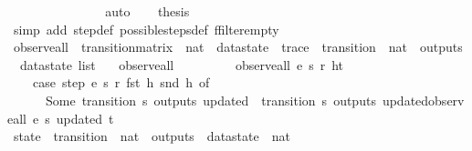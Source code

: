 \begin{isabellebody}
\ \ \ \ \ \ \ {\isacharbraceleft}{\isacharbar}{\isacharbar}{\isacharbraceright}\ {\isacharequal}\ {\isacharbraceleft}{\isacharbar}{\isacharbar}{\isacharbraceright}{\isachardoublequoteclose}\isanewline
\ \ \ \ \isamarkupfalse%
\ auto\isanewline
\ \ \isamarkupfalse%
\ {\isacharquery}thesis\isanewline
\ \ \ \ \isamarkupfalse%
\ {\isacharparenleft}simp\ add{\isacharcolon}\ step{\isacharunderscore}def\ possible{\isacharunderscore}steps{\isacharunderscore}def\ ffilter{\isacharunderscore}empty{\isacharparenright}\isanewline
{}\isamarkupfalse%
%
\endisatagproof
{\isafoldproof}%
%
\isadelimproof
\isanewline
%
\endisadelimproof
\isanewline
{}\isamarkupfalse%
\ observe{\isacharunderscore}all\ {\isacharcolon}{\isacharcolon}\ {\isachardoublequoteopen}transition{\isacharunderscore}matrix\ {\isasymRightarrow}\ nat\ {\isasymRightarrow}\ datastate\ {\isasymRightarrow}\ trace\ {\isasymRightarrow}\ {\isacharparenleft}transition\ {\isasymtimes}\ nat\ {\isasymtimes}\ outputs\ {\isasymtimes}\ datastate{\isacharparenright}\ list{\isachardoublequoteclose}\ \isanewline
\ \ {\isachardoublequoteopen}observe{\isacharunderscore}all\ {\isacharunderscore}\ {\isacharunderscore}\ {\isacharunderscore}\ {\isacharbrackleft}{\isacharbrackright}\ {\isacharequal}\ {\isacharbrackleft}{\isacharbrackright}{\isachardoublequoteclose}\ {\isacharbar}\isanewline
\ \ {\isachardoublequoteopen}observe{\isacharunderscore}all\ e\ s\ r\ {\isacharparenleft}h{\isacharhash}t{\isacharparenright}\ {\isacharequal}\isanewline
\ \ \ \ {\isacharparenleft}case\ {\isacharparenleft}step\ e\ s\ r\ {\isacharparenleft}fst\ h{\isacharparenright}\ {\isacharparenleft}snd\ h{\isacharparenright}{\isacharparenright}\ of\isanewline
\ \ \ \ \ \ {\isacharparenleft}Some\ {\isacharparenleft}transition{\isacharcomma}\ s{\isacharprime}{\isacharcomma}\ outputs{\isacharcomma}\ updated{\isacharparenright}{\isacharparenright}\ {\isasymRightarrow}\ {\isacharparenleft}{\isacharparenleft}{\isacharparenleft}transition{\isacharcomma}\ s{\isacharprime}{\isacharcomma}\ outputs{\isacharcomma}\ updated{\isacharparenright}{\isacharhash}{\isacharparenleft}observe{\isacharunderscore}all\ e\ s{\isacharprime}\ updated\ t{\isacharparenright}{\isacharparenright}{\isacharparenright}\ {\isacharbar}\isanewline
\ \ \ \ \ \ {\isacharunderscore}\ {\isasymRightarrow}\ {\isacharbrackleft}{\isacharbrackright}\isanewline
\ \ \ \ {\isacharparenright}{\isachardoublequoteclose}\isanewline
\isanewline
{}\isamarkupfalse%
\ state\ {\isacharcolon}{\isacharcolon}\ {\isachardoublequoteopen}{\isacharparenleft}transition\ {\isasymtimes}\ nat\ {\isasymtimes}\ outputs\ {\isasymtimes}\ datastate{\isacharparenright}\ {\isasymRightarrow}\ nat{\isachardoublequoteclose}\ \isanewline

\end{isabellebody}
